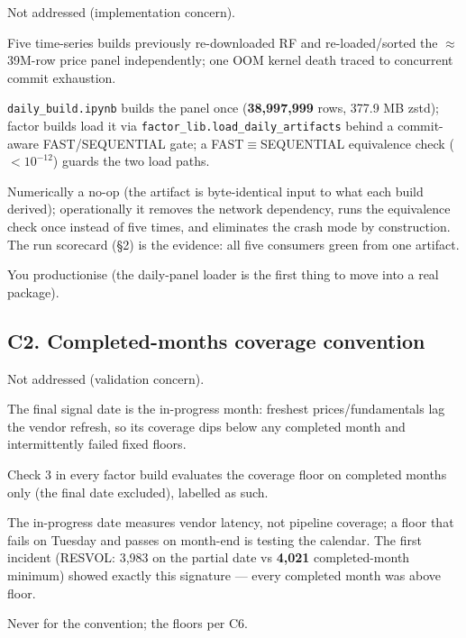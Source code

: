 \documentclass[11pt,a4paper]{article}
\begin{document}
\begin{description}[style=nextline]
  \item[USE4] Not addressed (implementation concern).
  \item[Deviation] Five time-series builds previously re-downloaded RF and
    re-loaded/sorted the $\approx$39M-row price panel independently; one OOM
    kernel death traced to concurrent commit exhaustion.
  \item[Solution] \texttt{daily\_build.ipynb} builds the panel once
    (\textbf{38{,}997{,}999} rows, 377.9 MB zstd); factor builds load it via
    \texttt{factor\_lib.load\_daily\_artifacts} behind a commit-aware
    FAST/SEQUENTIAL gate; a FAST$\equiv$SEQUENTIAL equivalence check
    ($<10^{-12}$) guards the two load paths.
  \item[Validity] Numerically a no-op (the artifact is byte-identical input to
    what each build derived); operationally it removes the network dependency,
    runs the equivalence check once instead of five times, and eliminates the
    crash mode by construction. The run scorecard (\S2) is the evidence: all
    five consumers green from one artifact.
  \item[Revisit when] You productionise (the daily-panel loader is the first
    thing to move into a real package).
\end{description}

\subsection{C2. Completed-months coverage convention}

\begin{description}[style=nextline]
  \item[USE4] Not addressed (validation concern).
  \item[Deviation] The final signal date is the in-progress month: freshest
    prices/fundamentals lag the vendor refresh, so its coverage dips below any
    completed month and intermittently failed fixed floors.
  \item[Solution] Check 3 in every factor build evaluates the coverage floor on
    completed months only (the final date excluded), labelled as such.
  \item[Validity] The in-progress date measures vendor latency, not pipeline
    coverage; a floor that fails on Tuesday and passes on month-end is testing
    the calendar. The first incident (RESVOL: 3{,}983 on the partial date vs
    \textbf{4{,}021} completed-month minimum) showed exactly this signature ---
    every completed month was above floor.
  \item[Revisit when] Never for the convention; the floors per C6.
\end{description}
\end{document}
